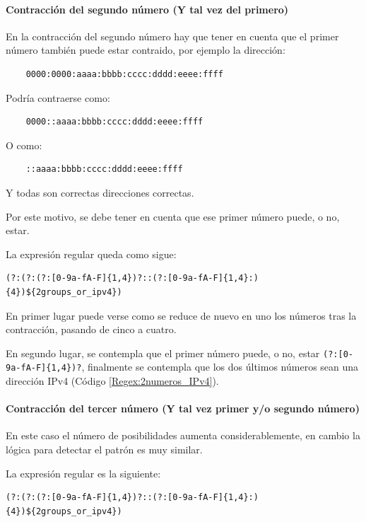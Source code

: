 \paragraph{Contracción del segundo número (Y tal vez del primero)}
En la contracción del segundo número hay que tener en cuenta que el primer número también puede estar contraido, por ejemplo la dirección:

\begin{verbatim}
    0000:0000:aaaa:bbbb:cccc:dddd:eeee:ffff
\end{verbatim}
Podría contraerse como:
\begin{verbatim}
    0000::aaaa:bbbb:cccc:dddd:eeee:ffff
\end{verbatim}
O como:
\begin{verbatim}
    ::aaaa:bbbb:cccc:dddd:eeee:ffff
\end{verbatim}
Y todas son correctas direcciones correctas.

Por este motivo, se debe tener en cuenta que ese primer número puede, o no, estar.

La expresión regular queda como sigue: 
\begin{lstlisting}[breaklines, caption={Expresión regular para capturar dirección IPv6 con el segundo número contraido (Y posibles anteriores)}, label={Regex:ipv6_2}, captionpos=b]
(?:(?:(?:[0-9a-fA-F]{1,4})?::(?:[0-9a-fA-F]{1,4}:){4})${2groups_or_ipv4})
 \end{lstlisting}

 En primer lugar puede verse como se reduce de nuevo en uno los números tras la contracción, pasando de cinco a cuatro.

 En segundo lugar, se contempla que el primer número puede, o no, estar \verb|(?:[0-9a-fA-F]{1,4})?|, finalmente se contempla que los dos últimos números sean una dirección IPv4 (Código \ref{Regex:2numeros_IPv4}).

\paragraph{Contracción del tercer número (Y tal vez primer y/o segundo número)}
En este caso el número de posibilidades aumenta considerablemente, en cambio la lógica para detectar el patrón es muy similar. 

La expresión regular es la siguiente: 
\begin{lstlisting}[breaklines, caption={Expresión regular para capturar dirección IPv6 con el tercer número contraido (Y posibles anteriores)}, label={Regex:ipv6_3}, captionpos=b]
    (?:(?:(?:[0-9a-fA-F]{1,4})?::(?:[0-9a-fA-F]{1,4}:){4})${2groups_or_ipv4})
\end{lstlisting}

